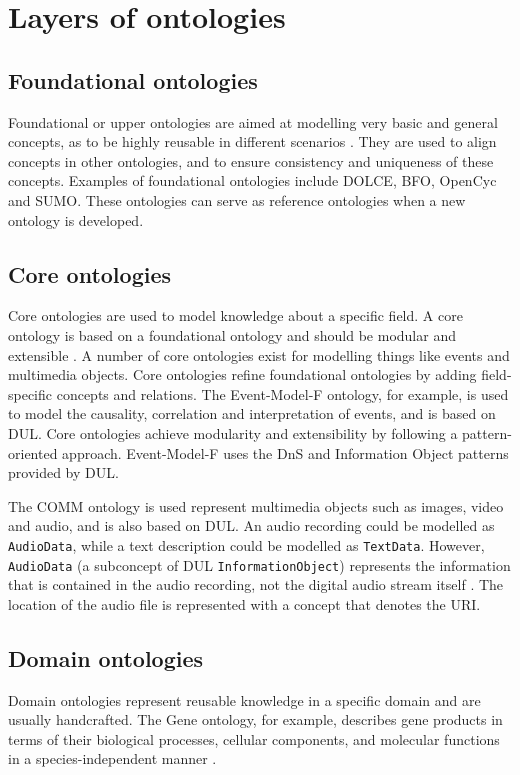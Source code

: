 \section{Layers of ontologies}

\subsection{Foundational ontologies}
Foundational or upper ontologies are aimed at modelling very basic and general concepts, as to be highly reusable in different scenarios \cite{Scherp2011}. They are used to align concepts in other ontologies, and to ensure consistency and uniqueness of these concepts. Examples of foundational ontologies include \ac{DOLCE}, \ac{BFO}, OpenCyc and \ac{SUMO}. These ontologies can serve as reference ontologies when a new ontology is developed.

\subsection{Core ontologies}

Core ontologies are used to model knowledge about a specific field. A core ontology is based on a foundational ontology and should be modular and extensible \cite{Scherp2011}. A number of core ontologies exist for modelling things like events and multimedia objects. Core ontologies refine foundational ontologies by adding field-specific concepts and relations. The Event-Model-F ontology, for example, is used to model the causality, correlation and interpretation of events, and is based on \ac{DUL}. Core ontologies achieve modularity and extensibility by following a pattern-oriented approach. Event-Model-F uses the \ac{DnS} and Information Object patterns provided by \ac{DUL}. 

The \ac{COMM} ontology is used represent multimedia objects such as images, video and audio, and is also based on \ac{DUL}. An audio recording could be modelled as \texttt{AudioData}, while a text description could be modelled as \texttt{TextData}. However, \texttt{AudioData} (a subconcept of \ac{DUL} \texttt{InformationObject}) represents the information that is contained in the audio recording, not the digital audio stream itself \cite{Scherp2011}. The location of the audio file is represented with a concept that denotes the \ac{URI}. 

\subsection{Domain ontologies}
Domain ontologies represent reusable knowledge in a specific domain and are usually handcrafted. The Gene ontology, for example, describes gene products in terms of their biological processes, cellular components, and molecular functions in a species-independent manner \cite{Jepsen2009}. 


